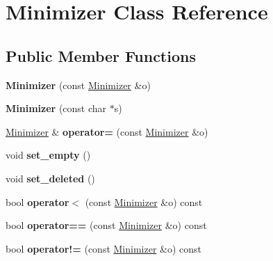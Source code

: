 \hypertarget{classMinimizer}{}\section{Minimizer Class Reference}
\label{classMinimizer}
\subsection*{Public Member Functions}
\begin{DoxyCompactItemize}
\item 
\mbox{\label{classMinimizer_a2227c7d6a14ec457361a0525582fe463}} 
{\bfseries Minimizer} (const \hyperlink{classMinimizer}{Minimizer} \&o)
\item 
\mbox{\label{classMinimizer_ab3ff51e20b6b6dc07159290d0d865a9e}} 
{\bfseries Minimizer} (const char $\ast$s)
\item 
\mbox{\label{classMinimizer_a0aa9a04fd7452a38d6fddce1bbafad50}} 
\hyperlink{classMinimizer}{Minimizer} \& {\bfseries operator=} (const \hyperlink{classMinimizer}{Minimizer} \&o)
\item 
\mbox{\label{classMinimizer_ae1ed7342a90d198f0629b4b2251fd0d9}} 
void {\bfseries set\+\_\+empty} ()
\item 
\mbox{\label{classMinimizer_ac2fd6d726d64d2839d92a98295db3674}} 
void {\bfseries set\+\_\+deleted} ()
\item 
\mbox{\label{classMinimizer_a0961dda15f188f0abc36a1af0665c432}} 
bool {\bfseries operator$<$} (const \hyperlink{classMinimizer}{Minimizer} \&o) const
\item 
\mbox{\label{classMinimizer_a0a8f4c9c629b555b32379fa02a0505be}} 
bool {\bfseries operator==} (const \hyperlink{classMinimizer}{Minimizer} \&o) const
\item 
\mbox{\label{classMinimizer_add1447b14e2ef273fe6ac4dda3cae62d}} 
bool {\bfseries operator!=} (const \hyperlink{classMinimizer}{Minimizer} \&o) const
\item 
\mbox{\label{classMinimizer_aee8066fecbb67ac5d61515049cbbd3ad}} 

\end{DoxyCompactItemize}
